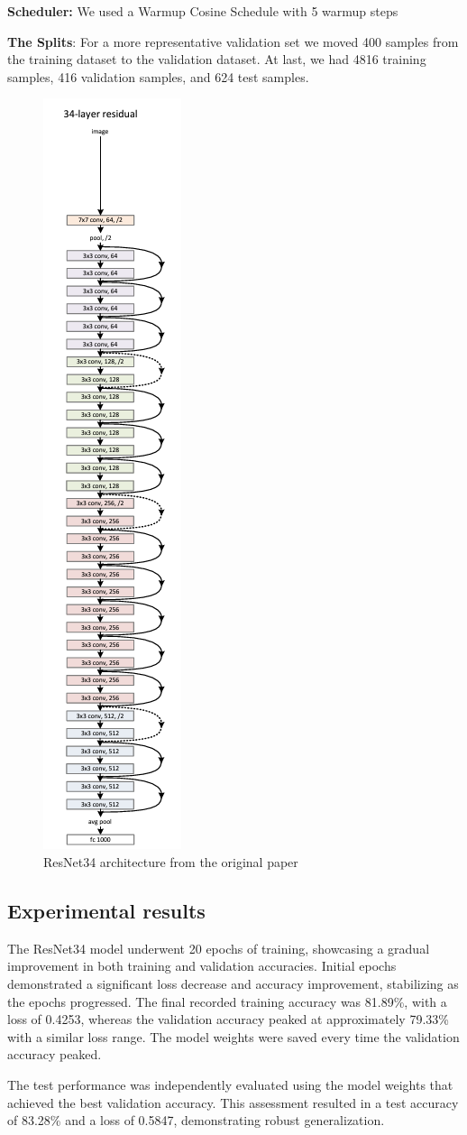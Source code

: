 \documentclass{article}
\begin{document}
\textbf{Scheduler:} We used a Warmup Cosine Schedule with 5 warmup steps

\textbf{The Splits}: For a more representative validation set we moved 400 samples from the training dataset to the validation dataset. At last, we had 4816 training samples, 416 validation samples, and 624 test samples.

\begin{figure}
  \centering
  \includegraphics[width=0.15\linewidth, angle=90]{resnet.png}
  \caption{ResNet34 architecture from the original paper}
  \label{fig:resnet}
\end{figure}

\subsection{Experimental results}
The ResNet34 model underwent 20 epochs of training, showcasing a gradual improvement in both training and validation accuracies. Initial epochs demonstrated a significant loss decrease and accuracy improvement, stabilizing as the epochs progressed. The final recorded training accuracy was 81.89\%, with a loss of 0.4253, whereas the validation accuracy peaked at approximately 79.33\% with a similar loss range. The model weights were saved every time the validation accuracy peaked.

The test performance was independently evaluated using the model weights that achieved the best validation accuracy. This assessment resulted in a test accuracy of 83.28\% and a loss of 0.5847, demonstrating robust generalization.
\end{document}

